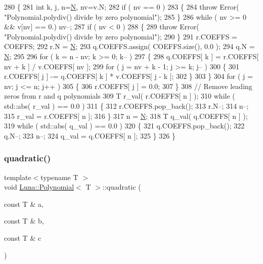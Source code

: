 \begin{DoxyCode}
280     \{
281         \textcolor{keywordtype}{int} k, j, n=\hyperlink{namespaceHeat__plot_a7d050092798e28458a263710837bda77}{N}, nv=v.N;
282         \textcolor{keywordflow}{if} ( nv == 0 )
283         \{
284              \textcolor{keywordflow}{throw} Error( \textcolor{stringliteral}{"Polynomial.polydiv() divide by zero polynomial"});
285         \}
286         \textcolor{keywordflow}{while} ( nv >= 0 && v[nv] == 0.) nv--;
287         \textcolor{keywordflow}{if} ( nv < 0 )
288         \{
289              \textcolor{keywordflow}{throw} Error( \textcolor{stringliteral}{"Polynomial.polydiv() divide by zero polynomial"});
290         \}
291         r.COEFFS = COEFFS;
292         r.N = \hyperlink{namespaceHeat__plot_a7d050092798e28458a263710837bda77}{N};
293         q.COEFFS.assign( COEFFS.size(), 0.0 );
294         q.N = \hyperlink{namespaceHeat__plot_a7d050092798e28458a263710837bda77}{N};
295 
296         \textcolor{keywordflow}{for} ( k = n - nv; k >= 0; k-- )
297         \{
298             q.COEFFS[ k ] = r.COEFFS[ nv + k ] / v.COEFFS[ nv ];
299             \textcolor{keywordflow}{for} ( j = nv + k - 1; j >= k; j-- )
300             \{
301                  r.COEFFS[ j ] -= q.COEFFS[ k ] * v.COEFFS[ j - k ];
302             \}
303         \}
304         \textcolor{keywordflow}{for} ( j = nv; j <= n; j++ )
305         \{
306              r.COEFFS[ j ] = 0.0;
307         \}
308         \textcolor{comment}{// Remove leading zeros from r and q polynomials}
309         T r\_val( r.COEFFS[ n ] );
310         \textcolor{keywordflow}{while} ( std::abs( r\_val ) == 0.0 )
311         \{
312             r.COEFFS.pop\_back();
313             r.N--;
314             n--;
315             r\_val = r.COEFFS[ n ];
316         \}
317         n = \hyperlink{namespaceHeat__plot_a7d050092798e28458a263710837bda77}{N};
318         T q\_val( q.COEFFS[ n ] );
319         \textcolor{keywordflow}{while} ( std::abs( q\_val ) == 0.0 )
320         \{
321             q.COEFFS.pop\_back();
322             q.N--;
323             n--;
324             q\_val = q.COEFFS[ n ];
325         \}
326     \}
\end{DoxyCode}
\mbox{\label{classLuna_1_1Polynomial_acfcaf54342579a975c876d353242b1b5}} 
\subsubsection{\texorpdfstring{quadratic()}{quadratic()}}
{\footnotesize\ttfamily template$<$typename T $>$ \\
void \hyperlink{classLuna_1_1Polynomial}{Luna\+::\+Polynomial}$<$ T $>$\+::quadratic (\begin{DoxyParamCaption}\item[{const T \&}]{a,  }\item[{const T \&}]{b,  }\item[{const T \&}]{c }\end{DoxyParamCaption})\hspace{0.3cm}{\ttfamily [inline]}}




